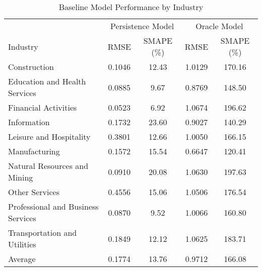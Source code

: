 \begin{table}[htbp]
\centering
\caption{Baseline Model Performance by Industry}
\label{tab:baseline_performance}
\begin{tabular}{lcccc}
\toprule
& \multicolumn{2}{c}{Persistence Model} & \multicolumn{2}{c}{Oracle Model} \\
\cmidrule(lr){2-3} \cmidrule(lr){4-5}
Industry & RMSE & SMAPE (\%) & RMSE & SMAPE (\%) \\
\midrule
Construction & 0.1046 & 12.43 & 1.0129 & 170.16 \\
Education and Health Services & 0.0885 & 9.67 & 0.8769 & 148.50 \\
Financial Activities & 0.0523 & 6.92 & 1.0674 & 196.62 \\
Information & 0.1732 & 23.60 & 0.9027 & 140.29 \\
Leisure and Hospitality & 0.3801 & 12.66 & 1.0050 & 166.15 \\
Manufacturing & 0.1572 & 15.54 & 0.6647 & 120.41 \\
Natural Resources and Mining & 0.0910 & 20.08 & 1.0630 & 197.63 \\
Other Services & 0.4556 & 15.06 & 1.0506 & 176.54 \\
Professional and Business Services & 0.0870 & 9.52 & 1.0066 & 160.80 \\
Transportation and Utilities & 0.1849 & 12.12 & 1.0625 & 183.71 \\
\midrule
Average & 0.1774 & 13.76 & 0.9712 & 166.08 \\
\bottomrule
\end{tabular}
\end{table}
